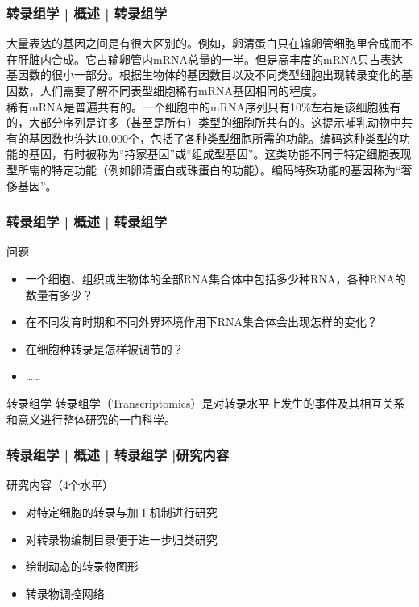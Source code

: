 \begin{frame}
  \frametitle{转录组学 | 概述 | 转录组学}
大量表达的基因之间是有很大区别的。例如，卵清蛋白只在输卵管细胞里合成而不在肝脏内合成。它占输卵管内mRNA总量的一半。但是高丰度的mRNA只占表达基因数的很小一部分。根据生物体的基因数目以及不同类型细胞出现转录变化的基因数，人们需要了解不同表型细胞稀有mRNA基因相同的程度。\\
\vspace{1em}
稀有mRNA是普遍共有的。一个细胞中的mRNA序列只有10\%左右是该细胞独有的，大部分序列是许多（甚至是所有）类型的细胞所共有的。这提示哺乳动物中共有的基因数也许达10,000个，包括了各种类型细胞所需的功能。编码这种类型的功能的基因，有时被称为“持家基因”或“组成型基因”。这类功能不同于特定细胞表现型所需的特定功能（例如卵清蛋白或珠蛋白的功能）。编码特殊功能的基因称为“奢侈基因”。
\end{frame}

\begin{frame}
  \frametitle{转录组学 | 概述 | 转录组学}
  \begin{block}{问题}
    \begin{itemize}
      \item 一个细胞、组织或生物体的全部RNA集合体中包括多少种RNA，各种RNA的数量有多少？
      \item 在不同发育时期和不同外界环境作用下RNA集合体会出现怎样的变化？
      \item 在细胞种转录是怎样被调节的？
      \item ……
    \end{itemize}
  \end{block}
  \pause
  \begin{block}{转录组学}
    转录组学（Transcriptomics）是对转录水平上发生的事件及其相互关系和意义进行整体研究的一门科学。
  \end{block}
\end{frame}

\begin{frame}
  \frametitle{转录组学 | 概述 | 转录组学 |研究内容}
  \begin{block}{研究内容（4个水平）}
    \begin{itemize}
      \item 对特定细胞的转录与加工机制进行研究
      \item 对转录物编制目录便于进一步归类研究
      \item 绘制动态的转录物图形
      \item 转录物调控网络
    \end{itemize}
  \end{block}
\end{frame}

